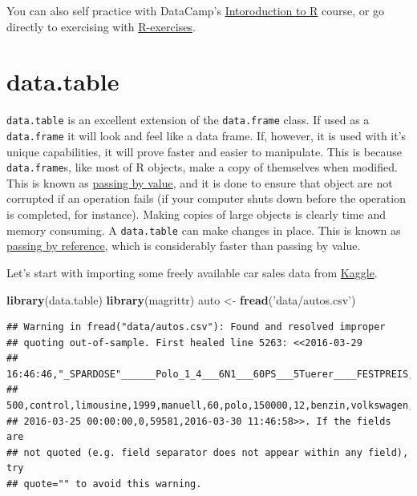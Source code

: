 \documentclass[]{book}
\newenvironment{Shaded}{\begin{snugshade}}{\end{snugshade}}
\newcommand{\KeywordTok}[1]{\textcolor[rgb]{0.13,0.29,0.53}{\textbf{#1}}}
\newcommand{\StringTok}[1]{\textcolor[rgb]{0.31,0.60,0.02}{#1}}
\newcommand{\NormalTok}[1]{#1}
\theoremstyle{definition}
\theoremstyle{definition}
\theoremstyle{definition}
\theoremstyle{remark}
\begin{document}
You can also self practice with DataCamp's
\href{https://www.datacamp.com/courses/free-introduction-to-r}{Intoroduction
to R} course, or go directly to exercising with
\href{https://www.r-exercises.com/start-here-to-learn-r/}{R-exercises}.

\chapter{data.table}\label{datatable}

\texttt{data.table} is an excellent extension of the \texttt{data.frame}
class. If used as a \texttt{data.frame} it will look and feel like a
data frame. If, however, it is used with it's unique capabilities, it
will prove faster and easier to manipulate. This is because
\texttt{data.frame}s, like most of R objects, make a copy of themselves
when modified. This is known as
\href{https://stackoverflow.com/questions/373419/whats-the-difference-between-passing-by-reference-vs-passing-by-value}{passing
by value}, and it is done to ensure that object are not corrupted if an
operation fails (if your computer shuts down before the operation is
completed, for instance). Making copies of large objects is clearly time
and memory consuming. A \texttt{data.table} can make changes in place.
This is known as
\href{https://stackoverflow.com/questions/373419/whats-the-difference-between-passing-by-reference-vs-passing-by-value}{passing
by reference}, which is considerably faster than passing by value.

Let's start with importing some freely available car sales data from
\href{https://www.kaggle.com/orgesleka/used-cars-database}{Kaggle}.

\begin{Shaded}
\begin{Highlighting}[]
\KeywordTok{library}\NormalTok{(data.table)}
\KeywordTok{library}\NormalTok{(magrittr)}
\NormalTok{auto <-}\StringTok{ }\KeywordTok{fread}\NormalTok{(}\StringTok{'data/autos.csv'}\NormalTok{)}
\end{Highlighting}
\end{Shaded}

\begin{verbatim}
## Warning in fread("data/autos.csv"): Found and resolved improper
## quoting out-of-sample. First healed line 5263: <<2016-03-29
## 16:46:46,"_SPARDOSE"______Polo_1_4___6N1___60PS___5Tuerer____FESTPREIS,privat,Angebot,
## 500,control,limousine,1999,manuell,60,polo,150000,12,benzin,volkswagen,ja,
## 2016-03-25 00:00:00,0,59581,2016-03-30 11:46:58>>. If the fields are
## not quoted (e.g. field separator does not appear within any field), try
## quote="" to avoid this warning.
\end{verbatim}
\end{document}
